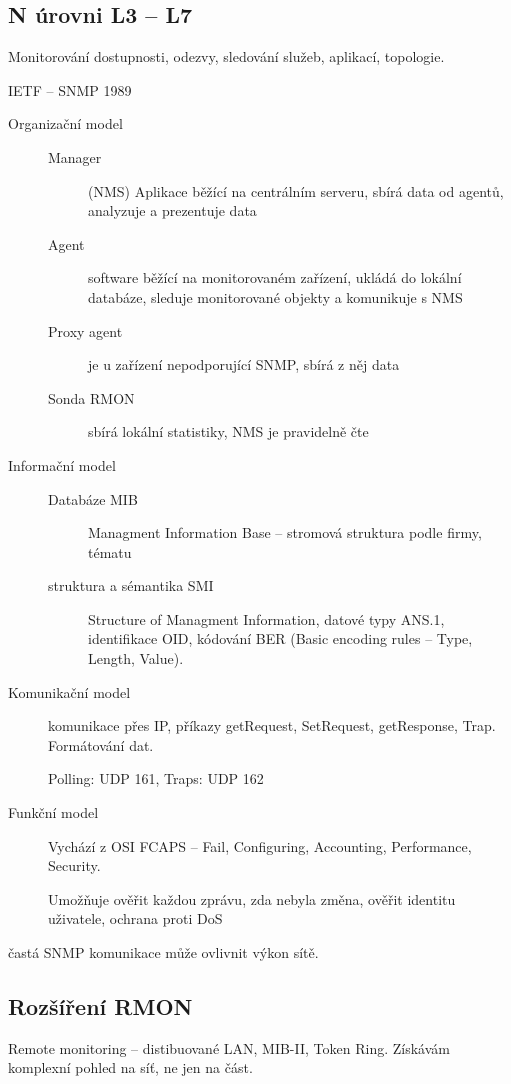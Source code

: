 \documentclass[a4wide]{report}
\begin{document}
\subsection{N úrovni L3 -- L7}
Monitorování dostupnosti, odezvy, sledování služeb, aplikací, topologie.

IETF -- SNMP 1989

\begin{description}
	\item[Organizační model] \hfill
	\begin{description}
		\item[Manager] (NMS) Aplikace běžící na centrálním serveru, sbírá data od agentů, analyzuje a prezentuje data
		\item[Agent] software běžící na monitorovaném zařízení, ukládá do lokální databáze, sleduje monitorované objekty a komunikuje s NMS
		\item[Proxy agent] je u zařízení nepodporující SNMP, sbírá z něj data
		\item[Sonda RMON] sbírá lokální statistiky, NMS je pravidelně čte
	\end{description}
	\item[Informační model] \hfill
	\begin{description}
		\item[Databáze MIB] Managment Information Base -- stromová struktura podle firmy, tématu
		\item[struktura a sémantika SMI] Structure of Managment Information, datové typy ANS.1, identifikace OID, kódování BER (Basic encoding rules -- Type, Length, Value).
	\end{description}
	\item[Komunikační model] komunikace přes IP, příkazy getRequest, SetRequest, getResponse, Trap. Formátování dat.
	
	Polling: UDP 161, Traps: UDP 162
	
	\item[Funkční model] Vychází z OSI FCAPS -- Fail, Configuring, Accounting, Performance, Security.
	
	Umožňuje ověřit každou zprávu, zda nebyla změna, ověřit identitu uživatele, ochrana proti DoS
\end{description}

častá SNMP komunikace může ovlivnit výkon sítě.

\subsection{Rozšíření RMON}
Remote monitoring -- distibuované LAN, MIB-II, Token Ring. Získávám komplexní pohled na síť, ne jen na část.
\end{document}
